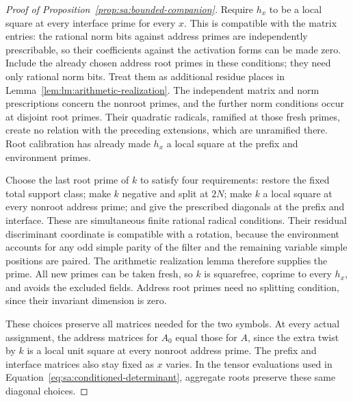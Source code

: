 \begin{proof}[Proof of Proposition~\ref{prop:sa:bounded-companion}]
Require $h_x$ to be a local square at every interface prime for every
$x$.  This is compatible with the matrix entries: the rational norm
bits against address primes are independently prescribable, so their
coefficients against the activation forms can be made zero.  Include
the already chosen address root primes in these conditions; they need
only rational norm bits. Treat them as additional residue places in
Lemma~\ref{lem:lm:arithmetic-realization}. The independent matrix and
norm prescriptions concern the nonroot primes, and the further norm
conditions occur at disjoint root primes. Their quadratic radicals,
ramified at those fresh primes, create no relation with the preceding
extensions, which are unramified there. Root calibration has already made $h_x$ a local
square at the prefix and environment primes.

Choose the last root prime of $k$ to satisfy four requirements: restore
the fixed total support class; make $k$ negative and split at $2N$;
make $k$ a local square at every nonroot address prime; and give the
prescribed diagonals at the prefix and interface.  These are
simultaneous finite rational radical conditions.  Their residual
discriminant coordinate is compatible with a rotation, because the
environment accounts for any odd simple parity of the filter and the
remaining variable simple positions are paired.  The arithmetic
realization lemma therefore supplies the prime.  All new primes can
be taken fresh, so $k$ is squarefree, coprime to every $h_x$, and
avoids the excluded fields.  Address root primes need no splitting
condition, since their invariant dimension is zero.

These choices preserve all matrices needed for the two symbols.
At every actual assignment, the address matrices for $A_0$ equal
those for $A$, since the extra twist by $k$ is a local unit square
at every nonroot address prime.  The prefix and interface matrices
also stay fixed as $x$ varies.  In the tensor evaluations used in
Equation~\eqref{eq:sa:conditioned-determinant}, aggregate roots
preserve these same diagonal choices.


\end{proof}
